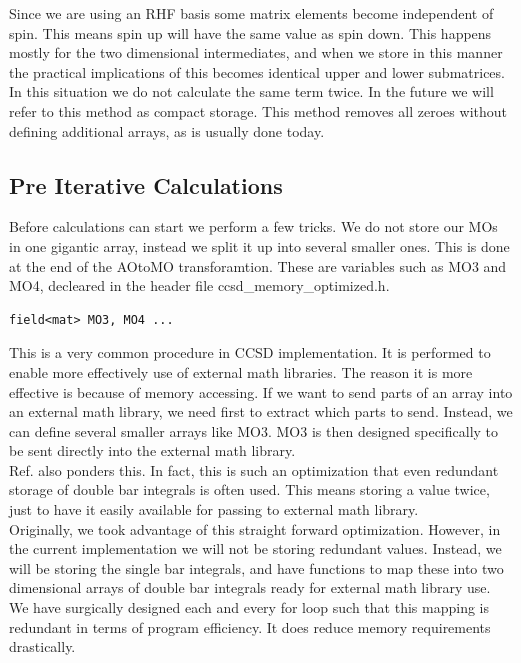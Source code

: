 \documentclass[a4paper,norsk,11pt,twoside]{report}
\begin{document}
Since we are using an RHF basis some matrix elements become independent of spin. This means spin up will have the same value as spin down. This happens mostly for the two dimensional intermediates, and when we store in this manner the practical implications of this becomes identical upper and lower submatrices. In this situation we do not calculate the same term twice. In the future we will refer to this method as compact storage. This method removes all zeroes without defining additional arrays, as is usually done today. 

\subsection{Pre Iterative Calculations}
Before calculations can start we perform a few tricks. We do not store our MOs in one gigantic array, instead we split it up into several smaller ones. This is done at the end of the AOtoMO transforamtion. These are variables such as MO3 and MO4, decleared in the header file ccsd\_memory\_optimized.h.

\begin{lstlisting}
field<mat> MO3, MO4 ...
\end{lstlisting}
This is a very common procedure in CCSD implementation. It is performed to enable more effectively use of external math libraries. The reason it is more effective is because of memory accessing. If we want to send parts of an array into an external math library, we need first to extract which parts to send. Instead, we can define several smaller arrays like MO3. MO3 is then designed specifically to be sent directly into the external math library. \\

Ref.\cite{ccsd_fac3} also ponders this. In fact, this is such an optimization that even redundant storage of double bar integrals is often used. This means storing a value twice, just to have it easily available for passing to external math library. \\

Originally, we took advantage of this straight forward optimization. However, in the current implementation we will not be storing redundant values. Instead, we will be storing the single bar integrals, and have functions to map these into two dimensional arrays of double bar integrals ready for external math library use. We have surgically designed each and every for loop such that this mapping is redundant in terms of program efficiency. It does reduce memory requirements drastically. \\
\end{document}
